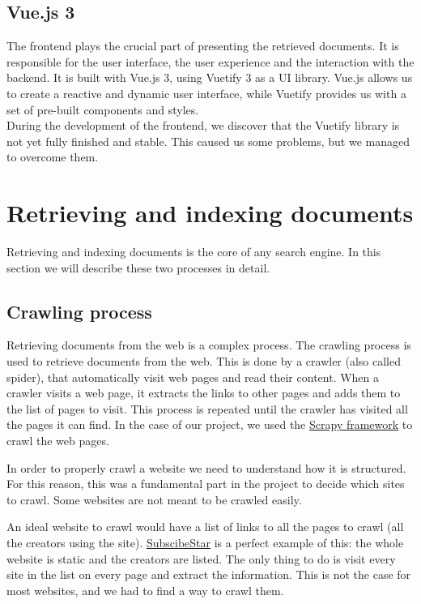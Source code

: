 \documentclass[tikz,14pt]{article}
\begin{document}
\subsection{Vue.js 3} \label{sec:vuejs}
The frontend plays the crucial part of presenting the retrieved documents. 
It is responsible for the user interface, the user experience and the interaction with the backend. 
It is built with Vue.js 3, using Vuetify 3 as a UI library. Vue.js allows us to create a reactive and dynamic user interface, while Vuetify provides us with a set of pre-built components and styles.\\
During the development of the frontend, we discover that the Vuetify library is not yet fully finished and stable. This caused us some problems, but we managed to overcome them.\\


\section{Retrieving and indexing documents} \label{sec:retrieving}
Retrieving and indexing documents is the core of any search engine. In this section we will describe these two processes in detail.




\subsection{Crawling process} \label{sec:crawling}
Retrieving documents from the web is a complex process. 
The crawling process is used to retrieve documents from the web.
This is done by a crawler (also called spider), that automatically visit web pages and read their content.
When a crawler visits a web page, it extracts the links to other pages and adds them to the list of pages to visit.
This process is repeated until the crawler has visited all the pages it can find.
In the case of our project, we used the \href{https://scrapy.org/}{Scrapy framework} to crawl the web pages.

In order to properly crawl a website we need to understand how it is structured.
For this reason, this was a fundamental part in the project to decide which sites to crawl.
Some websites are not meant to be crawled easily.

An ideal website to crawl would have a list of links to all the pages to crawl (all the creators using the site).
\href{https://www.subscribestar.com/stars?_page=true&page=1}{SubscibeStar} is a perfect example of this:
the whole website is static and the creators are listed. 
The only thing to do is visit every site in the list on every page and extract the information.
This is not the case for most websites, and we had to find a way to crawl them.
\end{document}
